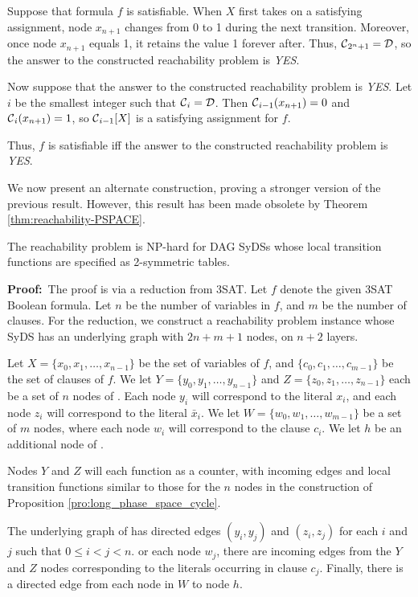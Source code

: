 Suppose that formula $f$ is satisfiable. 
When $X$ first takes on a satisfying assignment,
node $x_{n+1}$ changes from 0 to 1 during the next transition.
Moreover, once node $x_{n+1}$ equals 1, it retains the value 1 forever after.
Thus, $\mbox{$\mathcal{C}$}_{2^n+1} = \mbox{$\mathcal{D}$}$, so the answer to the constructed reachability problem is {\em YES}.

Now suppose that the answer to the constructed reachability problem is {\em YES}.
Let $i$ be the smallest integer such that $\mbox{$\mathcal{C}$}_i= \mbox{$\mathcal{D}$}$. 
Then $\mbox{$\mathcal{C}$}_{i-1}(x_{n+1}) =0$ and $\mbox{$\mathcal{C}$}_i(x_{n+1}) = 1$,
so $\mbox{$\mathcal{C}$}_{i-1}[X]$ is a satisfying assignment for $f$.

Thus, $f$ is satisfiable iff the answer to the constructed reachability problem is {\em YES}. 
\QED

We now present an alternate construction, proving a stronger version of the previous result.
However, this result has been made obsolete by Theorem \ref{thm:reachability-PSPACE}.
 
\smallskip
\begin{theorem}\label{thm:reachability-NP-rsymm}
The reachability problem is NP-hard for DAG SyDSs 
whose local transition functions are specified as 2-symmetric tables.
\end{theorem}

\noindent
\textbf{Proof:}~The proof is via a reduction from 3SAT.
Let $f$ denote the given 3SAT Boolean formula.
Let $n$ be the number of variables in $f$, and $m$ be the number of clauses.
For the reduction, we construct a reachability problem instance whose SyDS \cals{} 
has an underlying graph with $2n+m+1$ nodes, on $n+2$ layers.

Let $X = \{x_0, x_1, \dots , x_{n-1}\}$ be the set of variables of $f$,
and $\{c_0, c_1, \dots , c_{m-1}\}$ be the set of clauses of $f$.
We let $Y = \{y_0, y_1, \dots , y_{n-1}\}$ and $Z = \{z_0, z_1, \dots , z_{n-1}\}$ 
each be a set of $n$ nodes of \cals{}.
Each node $y_i$ will correspond to the literal $x_i$,
and each node $z_i$ will correspond to the literal ${\bar x_i}$.
We let $W = \{w_0, w_1, \dots , w_{m-1}\}$ be a set of $m$ nodes,
where each node $w_i$ will correspond to the clause $c_i$.
We let $h$ be an additional node of \cals{}.

Nodes $Y$ and $Z$ will each function as a counter,
with incoming edges and local transition functions similar to those for
the $n$ nodes in the construction of Proposition \ref{pro:long_phase_space_cycle}.

The underlying graph of \cals{} has directed edges
$(y_i, y_j)$ and $(z_i, z_j)$ for each $i$ and $j$ such that $0 \leq i < j < n$.
or each node $w_j$, there are incoming edges from the $Y$ and $Z$ nodes
corresponding to the literals occurring in clause $c_j$.
Finally, there is a directed edge from each node in $W$ to node $h$.

